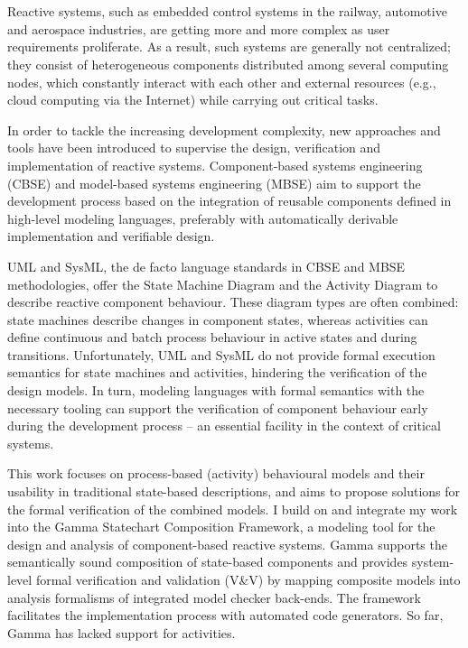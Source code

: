 \chapter{\bevezetes}

Reactive systems, such as embedded control systems in the railway, automotive and aerospace industries, are getting more and more complex as user requirements proliferate. As a result, such systems are generally not centralized; they consist of heterogeneous components distributed among several computing nodes, which constantly interact with each other and external resources  (e.g., cloud computing via the Internet) while carrying out critical tasks.

In order to tackle the increasing development complexity, new approaches and tools have been introduced to supervise the design, verification and implementation of reactive systems. Component-based systems engineering (CBSE)  and model-based systems engineering (MBSE) aim to support the development process based on the integration of reusable components defined in high-level modeling languages, preferably with automatically derivable implementation and verifiable design.

UML and SysML, the de facto language standards in CBSE and MBSE methodologies, offer the State Machine Diagram and the Activity Diagram to describe reactive component behaviour. These diagram types are often combined: state machines describe changes in component states, whereas activities can define continuous and batch process behaviour in active states and during transitions. Unfortunately, UML and SysML do not provide formal execution semantics for state machines and activities, hindering the verification of the design models. In turn, modeling languages with formal semantics with the necessary tooling can support the verification of component behaviour early during the development process -- an essential facility in the context of critical systems.

This work focuses on process-based (activity) behavioural models and their usability in traditional state-based descriptions, and aims to propose solutions for the formal verification of the combined models. I build on and integrate my work into the Gamma Statechart Composition Framework, a modeling tool for the design and analysis of component-based reactive systems. Gamma supports the semantically sound composition of state-based components and provides system-level formal verification and validation (V\&V) by mapping composite models into analysis formalisms of integrated model checker back-ends. The framework facilitates the implementation process with automated code generators. So far, Gamma has lacked support for activities.

